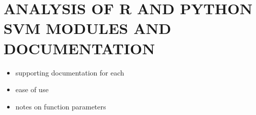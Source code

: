 \documentclass[12pt]{article}
\begin{document}
\section{ANALYSIS OF R AND PYTHON SVM MODULES AND DOCUMENTATION}

\begin{itemize}
    \item supporting documentation for each
    \item ease of use
    \item notes on function parameters
\end{itemize}

\newpage
\thispagestyle{empty}


\end{document}
